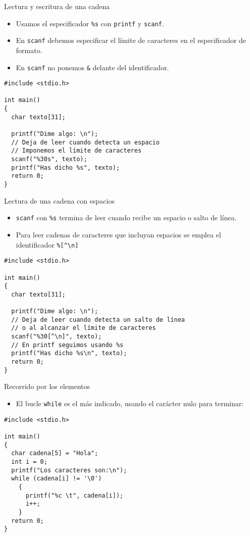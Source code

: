 \documentclass[xcolor={usenames,svgnames,dvipsnames}, aspectratio=169]{beamer}
\begin{document}
\begin{frame}[label={sec:org6b6427f},fragile]{Lectura y escritura de una cadena}
 \begin{itemize}
\item Usamos el especificador \texttt{\%s} con \texttt{printf} y \texttt{scanf}.

\item En \texttt{scanf} \alert{debemos} especificar el \alert{límite de caracteres} en el especificador de formato.

\item En \texttt{scanf} \alert{no} ponemos \texttt{\&} delante del identificador.
\end{itemize}

\lstset{language=C,label= ,caption= ,captionpos=b,numbers=none}
\begin{lstlisting}
#include <stdio.h>

int main()
{
  char texto[31];

  printf("Dime algo: \n");
  // Deja de leer cuando detecta un espacio
  // Imponemos el límite de caracteres
  scanf("%30s", texto); 
  printf("Has dicho %s", texto);
  return 0;
}
\end{lstlisting}
\end{frame}

\begin{frame}[label={sec:org5ac4af0},fragile]{Lectura de una cadena con espacios}
 \begin{itemize}
\item \texttt{scanf} con \texttt{\%s} termina de leer cuando recibe un espacio o salto de línea.
\item Para leer cadenas de caracteres que incluyan espacios se emplea el identificador \texttt{\%[\textasciicircum{}\textbackslash{}n]}
\end{itemize}
\lstset{language=C,label= ,caption= ,captionpos=b,numbers=none}
\begin{lstlisting}
#include <stdio.h>

int main()
{
  char texto[31];

  printf("Dime algo: \n");
  // Deja de leer cuando detecta un salto de línea
  // o al alcanzar el límite de caracteres
  scanf("%30[^\n]", texto);
  // En printf seguimos usando %s
  printf("Has dicho %s\n", texto);
  return 0;
}
\end{lstlisting}
\end{frame}
\begin{frame}[label={sec:orgc3e6f53},fragile]{Recorrido por los elementos}
 \begin{itemize}
\item El bucle \texttt{while} es el más indicado, usando el carácter nulo para terminar:
\end{itemize}

\lstset{language=C,label= ,caption= ,captionpos=b,numbers=none}
\begin{lstlisting}
#include <stdio.h>

int main()
{
  char cadena[5] = "Hola";
  int i = 0;
  printf("Los caracteres son:\n");
  while (cadena[i] != '\0')
    {
      printf("%c \t", cadena[i]);
      i++;
    }
  return 0;
}
\end{lstlisting}
\end{frame}
\end{document}
